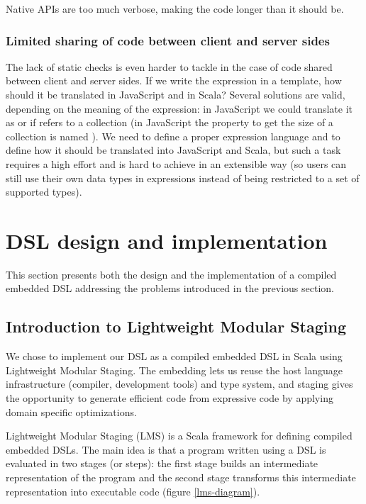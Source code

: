 \documentclass[american,english,runningheads]{llncs}
\begin{document}
Native APIs are too much verbose, making the code longer than it should be.

\subsubsection{Limited sharing of code between client and server sides}

The lack of static checks is even harder to tackle in the case of code shared between client and server sides. If we write the expression  in a template, how should it be translated in JavaScript and in Scala? Several solutions are valid, depending on the meaning of the expression: in JavaScript we could translate it as  or  if  refers to a collection (in JavaScript the property to get the size of a collection is named ). We need to define a proper expression language and to define how it should be translated into JavaScript and Scala, but such a task requires a high effort and is hard to achieve in an extensible way (so users can still use their own data types in expressions instead of being restricted to a set of supported types).

\section{DSL design and implementation}
\label{solution}

This section presents both the design and the implementation of a compiled embedded DSL addressing the problems introduced in the previous section.

\subsection{Introduction to Lightweight Modular Staging}
\label{intro-lms}

We chose to implement our DSL as a compiled embedded DSL in Scala using Lightweight Modular Staging. The embedding lets us reuse the host language infrastructure (compiler, development tools) and type system, and staging gives the opportunity to generate efficient code from expressive code by applying domain specific optimizations.

Lightweight Modular Staging (LMS) is a Scala framework for defining compiled embedded DSLs. The main idea is that a program written using a DSL is evaluated in two stages (or steps): the first stage builds an intermediate representation of the program and the second stage transforms this intermediate representation into executable code (figure \ref{lms-diagram}).
\end{document}
